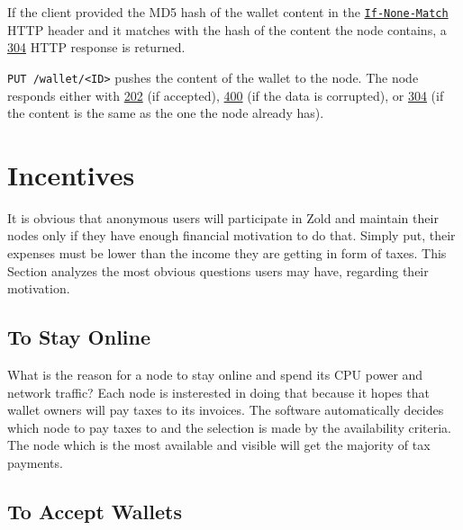 \documentclass[11pt,oneside]{article}
\newcommand\dd[1]{\colorbox{gray!30}{\texttt{#1}}}
\begin{document}
If the client provided the MD5 hash of the wallet content in the
\href{https://www.w3.org/Protocols/rfc2616/rfc2616-sec14.html#sec14.26}{\dd{If-None-Match}}
HTTP header and it matches with the hash of the
content the node contains, a
\href{https://www.w3.org/Protocols/rfc2616/rfc2616-sec10.html#sec10.3.5}{304} HTTP response is returned.

\dd{PUT /wallet/<ID>} pushes the content of the wallet to the node. The
node responds either with
\href{https://www.w3.org/Protocols/rfc2616/rfc2616-sec10.html#sec10.2.3}{202} (if accepted),
\href{https://www.w3.org/Protocols/rfc2616/rfc2616-sec10.html#sec10.4.1}{400} (if the data is corrupted),
or
\href{https://www.w3.org/Protocols/rfc2616/rfc2616-sec10.html#sec10.3.5}{304}
(if the content is the same as the one the node already has).

\section{Incentives}

It is obvious that anonymous users will participate in Zold and maintain
their nodes only if they have enough financial motivation to do that. Simply
put, their expenses must be lower than the income they are getting in
form of taxes. This Section analyzes the most obvious questions users
may have, regarding their motivation.

\subsection{To Stay Online}

What is the reason for a node to stay online and spend its CPU power
and network traffic? Each node is insterested in doing that because it
hopes that wallet owners will pay taxes to its invoices. The software
automatically decides which node to pay taxes to and the selection is
made by the availability criteria. The node which is the most available
and visible will get the majority of tax payments.

\subsection{To Accept Wallets}
\end{document}
